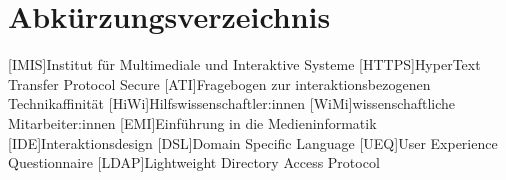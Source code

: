 
\cleardoublepage
{}
\chapter*{Abkürzungsverzeichnis}
\label{section-abbrevs}

\begin{acronym}[Companion]
  [IMIS]{Institut für Multimediale und Interaktive Systeme}
  [HTTPS]{HyperText Transfer Protocol Secure}
  [ATI]{Fragebogen zur interaktionsbezogenen Technikaffinität}
  [HiWi]{Hilfswissenschaftler:innen}
  [WiMi]{wissenschaftliche Mitarbeiter:innen}
  [EMI]{Einführung in die Medieninformatik}
  [IDE]{Interaktionsdesign}
  [DSL]{Domain Specific Language}
  [UEQ]{User Experience Questionnaire}  
  [LDAP]{Lightweight Directory Access Protocol}
\end{acronym}
